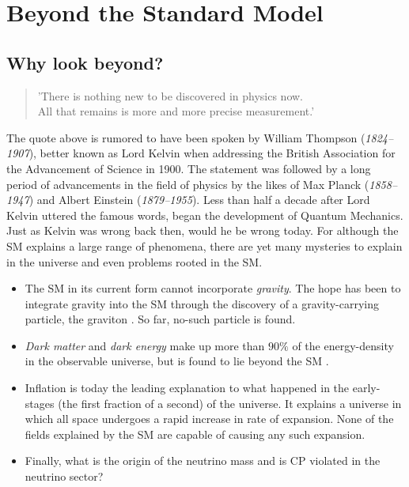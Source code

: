 \section{Beyond the Standard Model}
\subsection{Why look beyond?}
\begin{center}
    \hyphenblockcquote{UKenglish}{Kelvin}{
        'There is nothing new to be discovered in physics now.\\
        All that remains is more and more precise measurement.'
        }
\end{center}
The quote above is rumored to have been spoken by William Thompson (\emph{1824–1907}), better
known as Lord Kelvin when addressing the British Association for the Advancement
of Science in 1900. The statement was followed by a long period of advancements in the
field of physics by the likes of Max Planck (\emph{1858–1947}) and 
Albert Einstein (\emph{1879–1955}). Less than half a decade after Lord Kelvin
uttered the famous words, began the development of Quantum Mechanics. 
Just as Kelvin was wrong back then, would he be wrong today. For although the \ac{SM} explains 
a large range of phenomena, there are yet many mysteries to explain in the universe and even 
problems rooted in the \ac{SM}. 
\begin{itemize}
    \item The \ac{SM} in its current form cannot incorporate \emph{gravity}. 
    The hope has been to integrate gravity into the \ac{SM} through the discovery of a gravity-carrying particle, 
    the graviton \cite{Graviton}. So far, no-such particle is found.
    \item \emph{Dark matter} and \emph{dark energy} make up more than $90\%$ of the energy-density in the 
    observable universe, but is found to lie beyond the \ac{SM} \cite{DarkME}.
    \item Inflation is today the leading explanation to what happened in the early-stages
    (the first fraction of a second) of the universe. It explains a universe in which all space
    undergoes a rapid increase in rate of expansion. None of the fields explained by the \ac{SM} are 
    capable of causing any such expansion.
    \item Finally, what is the origin of the neutrino 
    mass and is \ac{CP} violated in the neutrino sector? 
\end{itemize}
